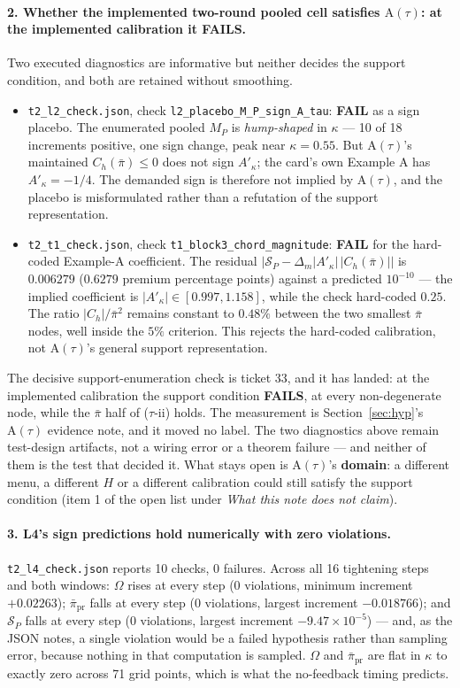 \documentclass[11pt,a4paper]{article}
\newcommand{\Atau}{\mathrm{A}(\tau)}
\newcommand{\Akap}{A'_{\kappa}}
\begin{document}
\paragraph{2. Whether the implemented two-round pooled cell satisfies $\Atau$: at the
implemented calibration it FAILS.} Two executed diagnostics are informative but
neither decides the support condition, and both are retained without smoothing.
\begin{itemize}
\item \texttt{t2\_l2\_check.json}, check \texttt{l2\_placebo\_M\_P\_sign\_A\_tau}:
  \textbf{FAIL} as a sign placebo. The enumerated pooled $M_P$ is \emph{hump-shaped}
  in $\kappa$ --- 10 of 18 increments positive, one sign change, peak near
  $\kappa=0.55$. But $\Atau$'s maintained $C_h(\bar\pi)\le0$ does not sign $\Akap$;
  the card's own Example A has $\Akap=-1/4$. The demanded sign is therefore not
  implied by $\Atau$, and the placebo is misformulated rather than a refutation of
  the support representation.
\item \texttt{t2\_t1\_check.json}, check \texttt{t1\_block3\_chord\_magnitude}:
  \textbf{FAIL} for the hard-coded Example-A coefficient. The residual
  $\bigl|\mathcal S_P-\Delta_m|\Akap|\,|C_h(\bar\pi)|\bigr|$ is $0.006279$
  ($0.6279$ premium percentage points) against a predicted $10^{-10}$ --- the implied
  coefficient is \textbf{$|\Akap|\in[0.997,1.158]$}, while the check hard-coded
  $0.25$. The ratio $|C_h|/\bar\pi^2$ remains constant to $0.48\%$ between the two
  smallest $\bar\pi$ nodes, well inside the $5\%$ criterion. This rejects the
  hard-coded calibration, not $\Atau$'s general support representation.
\end{itemize}
The decisive support-enumeration check is ticket 33, and it has landed: at the
implemented calibration the support condition \textbf{FAILS}, at every non-degenerate
node, while the $\bar\pi$ half of ($\tau$-ii) holds. The measurement is
Section~\ref{sec:hyp}'s $\Atau$ evidence note, and it moved no label. The two
diagnostics above remain test-design artifacts, not a wiring error or a theorem
failure --- and neither of them is the test that decided it. What stays open is
$\Atau$'s \textbf{domain}: a different menu, a different $H$ or a different
calibration could still satisfy the support condition (item 1 of the open list under
\emph{What this note does not claim}).

\paragraph{3. L4's sign predictions hold numerically with zero violations.}
\texttt{t2\_l4\_check.json} reports 10 checks, 0 failures. Across all 16 tightening
steps and both windows: $\Omega$ rises at every step (0 violations, minimum increment
$+0.02263$); $\bar\pi_{\mathrm{pr}}$ falls at every step (0 violations, largest
increment $-0.018766$); and $\mathcal S_P$ falls at every step (0 violations, largest
increment $-9.47\times10^{-5}$) --- and, as the JSON notes, a single violation would
be a failed hypothesis rather than sampling error, because nothing in that
computation is sampled. $\Omega$ and $\bar\pi_{\mathrm{pr}}$ are flat in $\kappa$ to
exactly zero across 71 grid points, which is what the no-feedback timing predicts.
\end{document}
